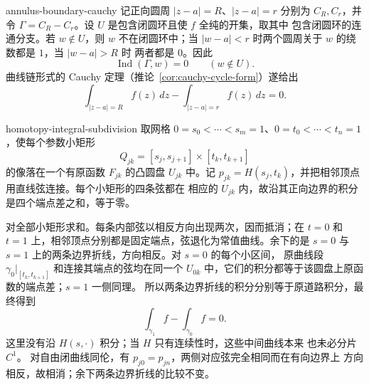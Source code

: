 \begin{solution}{annulus-boundary-cauchy}
记正向圆周 \(|z-a|=R\)、\(|z-a|=r\) 分别为 \(C_R,C_r\)，并令
\(\Gamma=C_R-C_r\)。设 \(U\) 是包含闭圆环且使 \(f\) 全纯的开集，取其中
包含闭圆环的连通分支。若 \(w\notin U\)，则 \(w\) 不在闭圆环中；当
\(|w-a|<r\) 时两个圆周关于 \(w\) 的绕数都是 \(1\)，当 \(|w-a|>R\) 时
两者都是 \(0\)。因此
\[
 \operatorname{Ind}(\Gamma,w)=0\qquad(w\notin U).
\]
曲线链形式的 Cauchy 定理（推论~\ref{cor:cauchy-cycle-form}）遂给出
\[
 \int_{|z-a|=R}f(z)\,dz-\int_{|z-a|=r}f(z)\,dz=0.
\]
\end{solution}

\begin{solution}{homotopy-integral-subdivision}
取网格 \(0=s_0<\cdots<s_m=1\)、\(0=t_0<\cdots<t_n=1\)，使每个参数小矩形
\[
 Q_{jk}=[s_j,s_{j+1}]\times[t_k,t_{k+1}]
\]
的像落在一个有原函数 \(F_{jk}\) 的凸圆盘 \(U_{jk}\) 中。记
\(p_{jk}=H(s_j,t_k)\)，并把相邻顶点用直线弦连接。每个小矩形的四条弦都在
相应的 \(U_{jk}\) 内，故沿其正向边界的积分是四个端点差之和，等于零。

对全部小矩形求和。每条内部弦以相反方向出现两次，因而抵消；在 \(t=0\)
和 \(t=1\) 上，相邻顶点分别都是固定端点，弦退化为常值曲线。余下的是
\(s=0\) 与 \(s=1\) 上的两条边界折线，方向相反。对 \(s=0\) 的每个小区间，
原曲线段 \(\gamma_0|_{[t_k,t_{k+1}]}\) 和连接其端点的弦均在同一个
\(U_{0k}\) 中，它们的积分都等于该圆盘上原函数的端点差；\(s=1\) 一侧同理。
所以两条边界折线的积分分别等于原道路积分，最终得到
\[
 \int_{\gamma_1}f-\int_{\gamma_0}f=0.
\]
这里没有沿 \(H(s,\cdot)\) 积分；当 \(H\) 只有连续性时，这些中间曲线本来
也未必分片 \(C^1\)。
对自由闭曲线同伦，有 \(p_{j0}=p_{jn}\)，两侧对应弦完全相同而在有向边界上
方向相反，故相消；余下两条边界折线的比较不变。
\end{solution}


